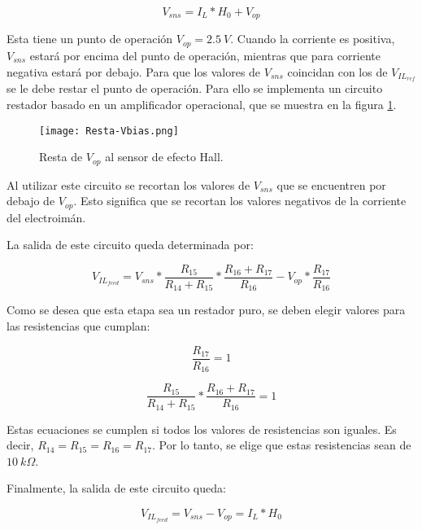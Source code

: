 \begin{equation}
	V_{sns}=I_L*H_0+V_{op}
\end{equation}

Esta tiene un punto de operación $V_{op}=2.5\:V$. Cuando la corriente es positiva, $V_{sns}$ estará por encima del punto de operación, mientras que para corriente negativa estará por debajo. Para que los valores de $V_{sns}$ coincidan con los de $V_{IL_{ref}}$ se le debe restar el punto de operación. Para ello se implementa un circuito restador basado en un amplificador operacional, que se muestra en la figura \ref{fig:img_resta-Vbias}.

\begin{figure}[H]
	\centering
	\texttt{[image: Resta-Vbias.png]}
	\caption{Resta de $V_{op}$ al sensor de efecto Hall.}
	\label{fig:img_resta-Vbias}
\end{figure}

Al utilizar este circuito se recortan los valores de $V_{sns}$ que se encuentren por debajo de $V_{op}$. Esto significa que se recortan los valores negativos de la corriente del electroimán.


La salida de este circuito queda determinada por:

\begin{equation}
	V_{IL_{feed}}=V_{sns}*\frac{R_{15}}{R_{14}+R_{15}}*\frac{R_{16}+R_{17}}{R_{16}}-V_{op}*\frac{R_{17}}{R_{16}}
\end{equation}

Como se desea que esta etapa sea un restador puro, se deben elegir valores para las resistencias que cumplan:

\begin{equation}
	\frac{R_{17}}{R_{16}}=1
\end{equation}

\begin{equation}
	\frac{R_{15}}{R_{14}+R_{15}}*\frac{R_{16}+R_{17}}{R_{16}}=1
\end{equation}

Estas ecuaciones se cumplen si todos los valores de resistencias son iguales. Es decir, $R_{14}=R_{15}=R_{16}=R_{17}$. Por lo tanto, se elige que estas resistencias sean de $10\:k\Omega$.

Finalmente, la salida de este circuito queda:

\begin{equation} \label{eq_salida_restador_hall}
	V_{IL_{feed}}=V_{sns}-V_{op}=I_L*H_0
\end{equation}


